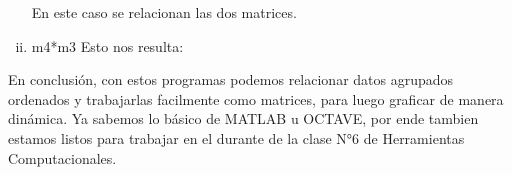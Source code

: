 \documentclass[a4paper]{article}
\begin{document}
\begin{enumerate}[i)]




\vspace{0,5cm}
En este caso se relacionan las dos matrices.
\item m4*m3  Esto nos resulta:





\vspace{0,4cm}
\end{enumerate} 
En conclusión, con estos programas podemos relacionar datos agrupados ordenados y trabajarlas facilmente como matrices, para luego graficar de manera dinámica. Ya sabemos lo básico de MATLAB u OCTAVE, por ende tambien estamos listos para trabajar en el durante de la clase N°6 de Herramientas Computacionales.
\end{document}
